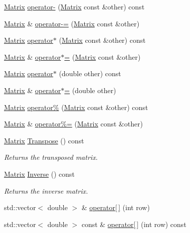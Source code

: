 \begin{DoxyCompactItemize}
\item 
\hyperlink{classMatrix}{Matrix} \hyperlink{classMatrix_a5f7129af600c22b69abdcb2c3b204e5a}{operator-\/} (\hyperlink{classMatrix}{Matrix} const \&other) const
\item 
\hyperlink{classMatrix}{Matrix} \& \hyperlink{classMatrix_a5871f028dc8b3ae8043a942b5840cdec}{operator-\/=} (\hyperlink{classMatrix}{Matrix} const \&other)
\item 
\hyperlink{classMatrix}{Matrix} \hyperlink{classMatrix_a087f5fbe295229d2790871bb14b6a2a5}{operator$\ast$} (\hyperlink{classMatrix}{Matrix} const \&other) const
\item 
\hyperlink{classMatrix}{Matrix} \& \hyperlink{classMatrix_a8d3c514ae15700397053fd3402552b1c}{operator$\ast$=} (\hyperlink{classMatrix}{Matrix} const \&other)
\item 
\hyperlink{classMatrix}{Matrix} \hyperlink{classMatrix_afdd6cdea30961d5ce34be67332c1d0dd}{operator$\ast$} (double other) const
\item 
\hyperlink{classMatrix}{Matrix} \& \hyperlink{classMatrix_ad2fd5772e288eb07a404907e6e1a1dd6}{operator$\ast$=} (double other)
\item 
\hyperlink{classMatrix}{Matrix} \hyperlink{classMatrix_aef843067e6c43218c7c909b6367706c2}{operator\%} (\hyperlink{classMatrix}{Matrix} const \&other) const
\item 
\hyperlink{classMatrix}{Matrix} \& \hyperlink{classMatrix_ac391b0910e9f0fc0a6e23c9346cee2ad}{operator\%=} (\hyperlink{classMatrix}{Matrix} const \&other)
\item 
\mbox{\label{classMatrix_ad0c96cdea0d2ae3403653ca90aa70796}} 
\hyperlink{classMatrix}{Matrix} \hyperlink{classMatrix_ad0c96cdea0d2ae3403653ca90aa70796}{Transpose} () const
\begin{DoxyCompactList}\small\item\em Returns the transposed matrix. \end{DoxyCompactList}\item 
\mbox{\label{classMatrix_ad5f101877c4a10988bf7f128a9c248d8}} 
\hyperlink{classMatrix}{Matrix} \hyperlink{classMatrix_ad5f101877c4a10988bf7f128a9c248d8}{Inverse} () const
\begin{DoxyCompactList}\small\item\em Returns the inverse matrix. \end{DoxyCompactList}\item 
std\+::vector$<$ double $>$ \& \hyperlink{classMatrix_a25cb20c90560327240a07d81ed11c746}{operator\mbox{[}$\,$\mbox{]}} (int row)
\item 
std\+::vector$<$ double $>$ const  \& \hyperlink{classMatrix_a120efaa8b3a945230e8a601927cb0e47}{operator\mbox{[}$\,$\mbox{]}} (int row) const
\end{DoxyCompactItemize}


